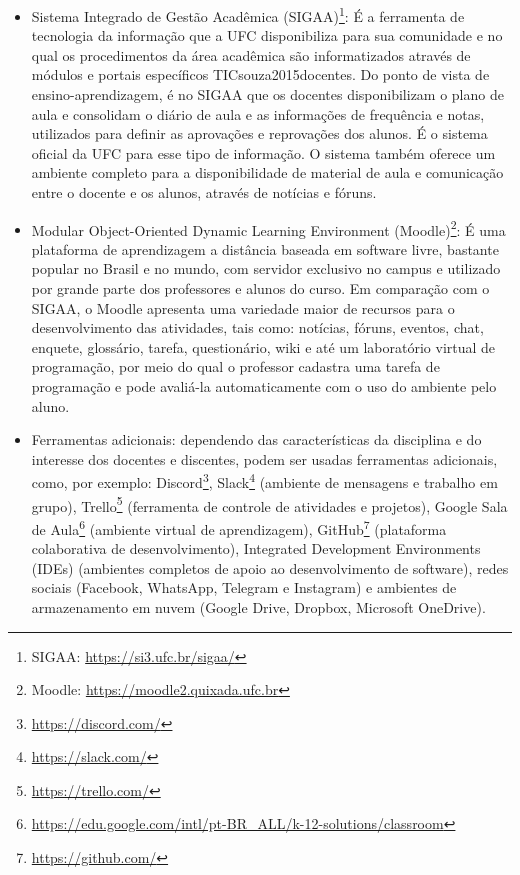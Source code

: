 \begin{itemize}
    \item Sistema Integrado de Gestão Acadêmica (SIGAA)\footnote{SIGAA: \url{https://si3.ufc.br/sigaa/}}: É a ferramenta de tecnologia da informação que a UFC disponibiliza para sua comunidade e no qual os procedimentos da área acadêmica são informatizados através de módulos e portais específicos TIC{souza2015docentes}. Do ponto de vista de ensino-aprendizagem, é no SIGAA que os docentes disponibilizam o plano de aula e consolidam o diário de aula e as informações de frequência e notas, utilizados para definir as aprovações e reprovações dos alunos. É o sistema oficial da UFC para esse tipo de informação. O sistema também oferece um ambiente completo para a disponibilidade de material de aula e comunicação entre o docente e os alunos, através de notícias e fóruns.
    \item Modular Object-Oriented Dynamic Learning Environment (Moodle)\footnote{Moodle: \url{https://moodle2.quixada.ufc.br}}: É uma plataforma de aprendizagem a distância baseada em software livre, bastante popular no Brasil e no mundo, com servidor exclusivo no campus e utilizado por grande parte dos professores e alunos do curso. Em comparação com o SIGAA, o Moodle apresenta uma variedade maior de recursos para o desenvolvimento das atividades, tais como: notícias, fóruns, eventos, chat, enquete, glossário, tarefa, questionário, wiki e até um laboratório virtual de programação, por meio do qual o professor cadastra uma tarefa de programação e pode avaliá-la automaticamente com o uso do ambiente pelo aluno. %
    \item Ferramentas adicionais: dependendo das características da disciplina e do interesse dos docentes e discentes, podem ser usadas ferramentas adicionais, como, por exemplo: Discord\footnote{\url{https://discord.com/}},  Slack\footnote{\url{https://slack.com/}} (ambiente de mensagens e trabalho em grupo), Trello\footnote{\url{https://trello.com/}} (ferramenta de controle de atividades e projetos), Google Sala de Aula\footnote{\url{https://edu.google.com/intl/pt-BR_ALL/k-12-solutions/classroom}} (ambiente virtual de aprendizagem), GitHub\footnote{\url{https://github.com/}} (plataforma colaborativa de desenvolvimento), Integrated Development Environments (IDEs) (ambientes completos de apoio ao desenvolvimento de software), redes sociais (Facebook, WhatsApp, Telegram e Instagram) e ambientes de armazenamento em nuvem (Google Drive, Dropbox, Microsoft OneDrive).
\end{itemize}


